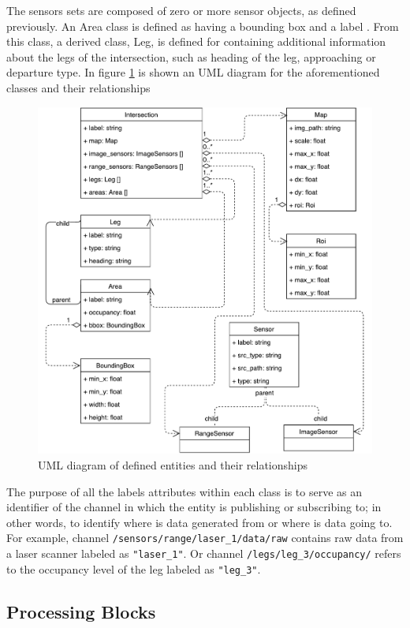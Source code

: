 The sensors sets are composed of zero or more sensor objects, as defined previously. An Area class is defined as having a bounding box and a label	. From this class, a derived class, Leg, is defined for containing additional information about the legs of the intersection, such as heading of the leg, approaching or departure type. In figure \ref{data_model} is shown an UML diagram for the aforementioned classes and their relationships

\begin{figure}[ht!]
\centering
\includegraphics[scale=0.5]{fig/3/data_model.pdf}
\caption{UML diagram of defined entities and their relationships}
\label{data_model}
\end{figure}

The purpose of all the labels attributes within each class is to serve as an identifier of the channel in which the entity is publishing or subscribing to; in other words, to identify where is data generated from or where is data going to. For example, channel \texttt{/sensors/range/laser\_1/data/raw} contains raw data from a laser scanner labeled as \texttt{"laser\_1"}. Or channel \texttt{/legs/leg\_3/occupancy/} refers to the occupancy level of the leg labeled as \texttt{"leg\_3"}.


\subsection{Processing Blocks}

